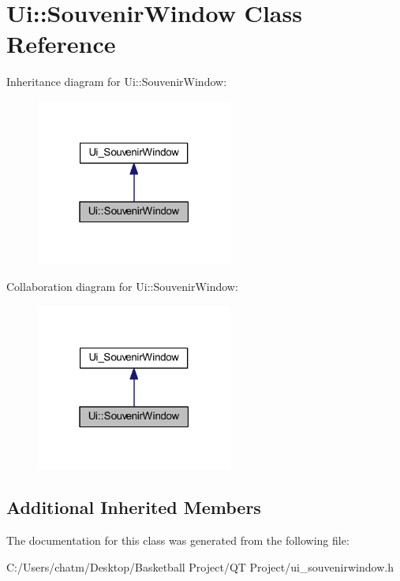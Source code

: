 \hypertarget{class_ui_1_1_souvenir_window}{}\section{Ui\+::Souvenir\+Window Class Reference}
\label{class_ui_1_1_souvenir_window}


Inheritance diagram for Ui\+::Souvenir\+Window\+:\nopagebreak
\begin{figure}[H]
\begin{center}
\leavevmode
\includegraphics[width=183pt]{class_ui_1_1_souvenir_window__inherit__graph}
\end{center}
\end{figure}


Collaboration diagram for Ui\+::Souvenir\+Window\+:\nopagebreak
\begin{figure}[H]
\begin{center}
\leavevmode
\includegraphics[width=183pt]{class_ui_1_1_souvenir_window__coll__graph}
\end{center}
\end{figure}
\subsection*{Additional Inherited Members}


The documentation for this class was generated from the following file\+:\begin{DoxyCompactItemize}
\item 
C\+:/\+Users/chatm/\+Desktop/\+Basketball Project/\+Q\+T Project/ui\+\_\+souvenirwindow.\+h\end{DoxyCompactItemize}
